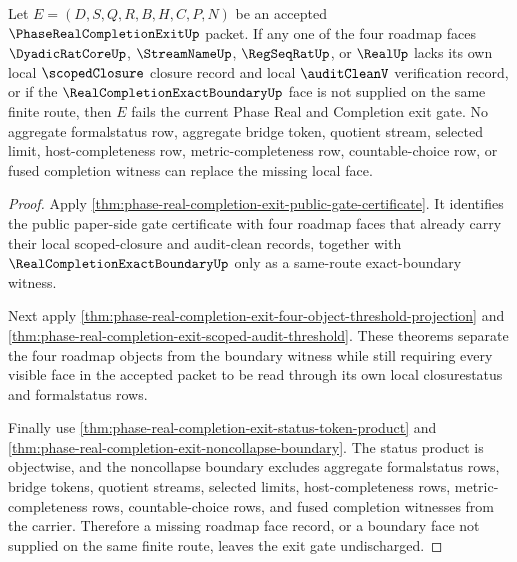 \begin{theorem}
\label{thm:phase-real-completion-exit-boundary-face-nonsubstitution}
Let $E=(D,S,Q,R,B,H,C,P,N)$ be an accepted $\PhaseRealCompletionExitUp$ packet. If any one of the four roadmap faces $\DyadicRatCoreUp$, $\StreamNameUp$, $\RegSeqRatUp$, or $\RealUp$ lacks its own local $\scopedClosure$ closure record and local $\auditCleanV$ verification record, or if the $\RealCompletionExactBoundaryUp$ face is not supplied on the same finite route, then $E$ fails the current Phase Real and Completion exit gate. No aggregate formalstatus row, aggregate bridge token, quotient stream, selected limit, host-completeness row, metric-completeness row, countable-choice row, or fused completion witness can replace the missing local face.
\end{theorem}
\begin{proof}
Apply \autoref{thm:phase-real-completion-exit-public-gate-certificate}. It identifies the public paper-side gate certificate with four roadmap faces that already carry their local scoped-closure and audit-clean records, together with $\RealCompletionExactBoundaryUp$ only as a same-route exact-boundary witness.

Next apply \autoref{thm:phase-real-completion-exit-four-object-threshold-projection} and \autoref{thm:phase-real-completion-exit-scoped-audit-threshold}. These theorems separate the four roadmap objects from the boundary witness while still requiring every visible face in the accepted packet to be read through its own local closurestatus and formalstatus rows.

Finally use \autoref{thm:phase-real-completion-exit-status-token-product} and \autoref{thm:phase-real-completion-exit-noncollapse-boundary}. The status product is objectwise, and the noncollapse boundary excludes aggregate formalstatus rows, bridge tokens, quotient streams, selected limits, host-completeness rows, metric-completeness rows, countable-choice rows, and fused completion witnesses from the carrier. Therefore a missing roadmap face record, or a boundary face not supplied on the same finite route, leaves the exit gate undischarged.
\end{proof}

